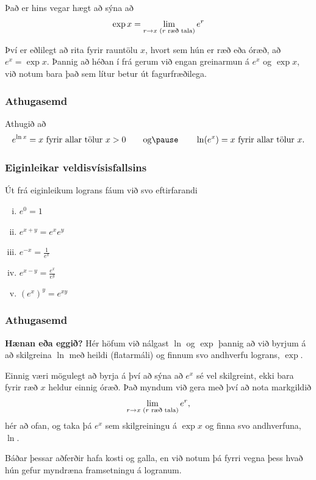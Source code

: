 \documentclass[icelandic,a4paper,12pt]{article}
\begin{document}
Það er hins vegar hægt að sýna að 
 $$
 \exp x=\lim_{r\rightarrow x \mbox{\scriptsize\ ($r$ ræð tala)}}e^r
 $$

\pause 

Því er eðlilegt að rita fyrir rauntölu $x$, hvort sem hún er ræð
 eða óræð, að $e^x=\exp x$. 
\pause 
Þannig að héðan í frá gerum við engan
greinarmun á $e^x$ og $\exp x$, við notum bara það sem
lítur betur út fagurfræðilega.


\pause

\subsubsection{Athugasemd}
Athugið að 
$$e^{\ln x}=x \mbox{ fyrir allar tölur }x>0\qquad \mbox{og}\pause
\qquad \ln(e^x)=x  \mbox{ fyrir allar tölur }x.$$



\subsubsection{Eiginleikar veldisvísisfallsins}
Út frá eiginleikum lograns fáum við svo eftirfarandi

\begin{enumerate}[(i)]
\item  $e^0=1$
\item  $e^{x+y}=e^x e^y$
\item  $e^{-x}=\frac{1}{e^x}$
\item  $e^{x-y}=\frac{e^x}{e^y}$
\item  $\left(e^x\right)^y=e^{xy}$
\end{enumerate}


\subsubsection{Athugasemd}
\textbf{Hænan eða eggið?}
Hér höfum við nálgast $\ln$ og $\exp$ þannig að 
við byrjum á að skilgreina $\ln$ með heildi (flatarmáli) og
finnum svo andhverfu lograns, $\exp$. 

\pause

Einnig væri mögulegt að byrja á því að sýna að $e^x$ sé 
vel skilgreint, ekki bara fyrir ræð $x$ heldur einnig 
óræð. Það myndum við gera með því að nota markgildið
$$\lim_{r\rightarrow x \mbox{\scriptsize\ ($r$ ræð tala)}}e^r,$$
hér að ofan, og taka þá $e^x$ sem skilgreiningu á 
$\exp x$ og finna svo andhverfuna, $\ln$.

\pause

Báðar þessar aðferðir hafa kosti og galla, en við notum þá
fyrri vegna þess hvað hún gefur myndræna framsetningu á 
logranum.
 
\end{document}
